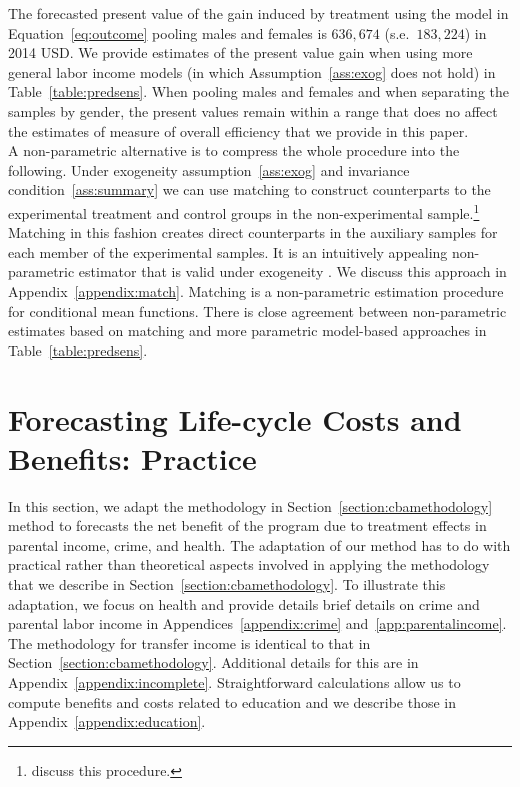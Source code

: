 \noindent The forecasted present value of the gain induced by treatment using the model in Equation~\eqref{eq:outcome} pooling males and females is $636,674$ (s.e.\ $183,224$) in 2014 USD. We provide estimates of the present value gain when using more general labor income models (in which Assumption~\ref{ass:exog} does not hold) in Table~\ref{table:predsens}. When pooling males and females and when separating the samples by gender, the present values remain within a range that does no affect the estimates of measure of overall efficiency that we provide in this paper.\\

\noindent A non-parametric alternative is to compress the whole procedure into the following. Under exogeneity assumption~\ref{ass:exog} and invariance condition~\ref{ass:summary} we can use matching to construct counterparts to the experimental treatment and control groups in the non-experimental sample.\footnote{\citet{Heckman_Ichimura_etal_1998_Econometrica} discuss this procedure.} Matching in this fashion creates direct counterparts in the auxiliary samples for each member of the experimental samples. It is an intuitively appealing non-parametric estimator that is valid under exogeneity \citep{Heckman_Navarro_2004_REStat}. We discuss this approach in Appendix~\ref{appendix:match}. Matching is a non-parametric estimation procedure for conditional mean functions. There is close agreement between non-parametric estimates based on matching and more parametric model-based approaches in Table~\ref{table:predsens}.

\section{Forecasting Life-cycle Costs and Benefits: Practice} \label{section:cbapractice}

\noindent In this section, we adapt the methodology in Section~\ref{section:cbamethodology} method to forecasts the net benefit of the program due to treatment effects in parental income, crime, and health. The adaptation of our method has to do with practical rather than theoretical aspects involved in applying the methodology that we describe in Section~\ref{section:cbamethodology}. To illustrate this adaptation, we focus on health and provide details brief details on crime and parental labor income in Appendices~\ref{appendix:crime} and~\ref{app:parentalincome}. The methodology for transfer income is identical to that in Section~\ref{section:cbamethodology}. Additional details for this are in Appendix~\ref{appendix:incomplete}. Straightforward calculations allow us to compute benefits and costs related to education and we describe those in Appendix~\ref{appendix:education}.


